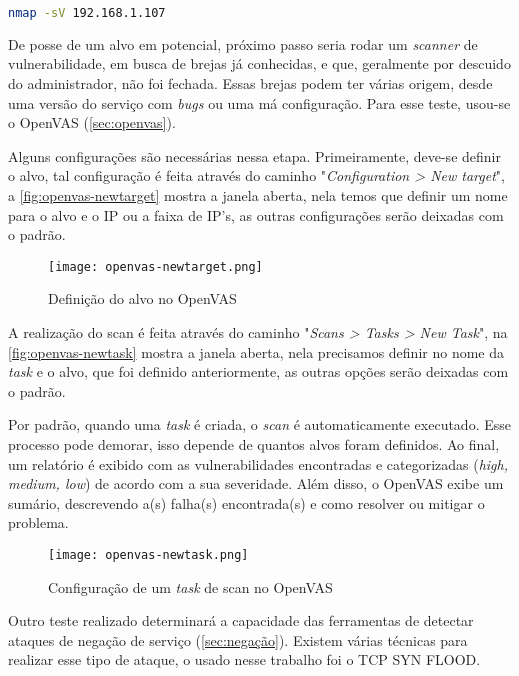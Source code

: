 \begin{lstlisting}[language=bash, frame=single]  
    nmap -sV 192.168.1.107
\end{lstlisting}

De posse de um alvo em potencial, próximo passo seria rodar um \textit{scanner} de vulnerabilidade, em busca de brejas já conhecidas, e que, geralmente por descuido do administrador, não foi fechada. Essas brejas podem ter várias origem, desde uma versão do serviço com \textit{bugs} ou uma má configuração. Para esse teste, usou-se o OpenVAS (\autoref{sec:openvas}).

Alguns configurações são necessárias nessa etapa. Primeiramente, deve-se definir o alvo, tal configuração é feita através do caminho "\textit{Configuration > New target}", a \autoref{fig:openvas-newtarget} mostra a janela aberta, nela temos que definir um nome para o alvo e o IP ou a faixa de IP's, as outras configurações serão deixadas com o padrão.

\begin{figure}[htb]
\centering
\caption{Definição do alvo no OpenVAS}
\texttt{[image: openvas-newtarget.png]}
\label{fig:openvas-newtarget}
\end{figure}

A realização do scan é feita através do caminho "\textit{Scans > Tasks > New Task}", na \autoref{fig:openvas-newtask} mostra a janela aberta, nela precisamos definir no nome da \textit{task} e o alvo, que foi definido anteriormente, as outras opções serão deixadas com o padrão. 

Por padrão, quando uma \textit{task} é criada, o \textit{scan} é automaticamente executado. Esse processo pode demorar, isso depende de quantos alvos foram definidos. Ao final, um relatório é exibido com as vulnerabilidades encontradas e categorizadas (\textit{high, medium, low}) de acordo com a sua severidade. Além disso, o OpenVAS exibe um sumário, descrevendo a(s) falha(s) encontrada(s) e como resolver ou mitigar o problema.

\begin{figure}[htb]
\centering
\caption{Configuração de um \textit{task} de scan no OpenVAS}
\texttt{[image: openvas-newtask.png]}
\label{fig:openvas-newtask}
\end{figure}

Outro teste realizado determinará a capacidade das ferramentas de detectar ataques de negação de serviço (\autoref{sec:negação}). Existem várias técnicas para realizar esse tipo de ataque, o usado nesse trabalho foi o TCP SYN FLOOD. 

